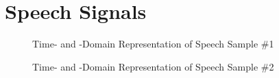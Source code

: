 \section*{Speech Signals}
\label{app:signals}

\begin{figure}[H]
\iftoggle{quick}{
    \texttt{[image: plots/signals/s1-time-stft-scr]}
}{%
\setlength{\figureheight}{3cm}
\setlength{\figurewidth}{0.8\textwidth}
\footnotesize
 \begin{subfigure}{\textwidth}
    \centering
    
    \caption{Time-Domain Representation}
 \end{subfigure}\\
 \begin{subfigure}{\textwidth}
    \centering
    
    \caption{STFT-Domain Representation}
 \end{subfigure}
}%
 \caption{Time- and -Domain Representation of Speech Sample \#1}
\end{figure}

\begin{figure}[H]
\iftoggle{quick}{
    \texttt{[image: plots/signals/s2-time-stft-scr]}
}{%
\setlength{\figureheight}{3cm}
\setlength{\figurewidth}{0.8\textwidth}
\footnotesize
 \begin{subfigure}{\textwidth}
 \centering
 
    \caption{Time-Domain Representation}
 \end{subfigure}\\
 \begin{subfigure}{\textwidth}
 \centering
    
    \caption{STFT-Domain Representation}
 \end{subfigure}
}
 \caption{Time- and -Domain Representation of Speech Sample \#2}
 \label{fig:signalRepresentation}
\end{figure}

%
% 
%    
%


